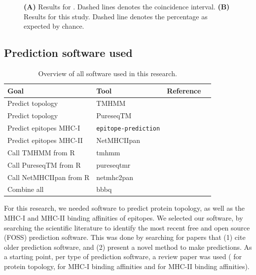 \begin{figure}
  \caption{
    \textbf{(A)} 
    Results for \cite{bianchi2017}. 
    Dashed lines denotes the coincidence interval.
    \textbf{(B)}
    Results for this study.
    Dashed line denotes the percentage as expected by chance.
  }
\end{figure}

\subsection{Prediction software used}
\label{subsec:prediction_software_used}

\begin{table}[]
  \begin{tabular}{llll}
    Goal & Tool & Reference \\ 
    \hline
    Predict topology                  & TMHMM                     & \cite{krogh2001predicting} \\
    Predict topology                  & PureseqTM                 & \cite{wang2019efficient} \\
    Predict epitopes MHC-I            & \verb;epitope-prediction; & \cite{bianchi2017} \\
    Predict epitopes MHC-II           & NetMHCIIpan               & \cite{nielsen2008quantitative,karosiene2013netmhciipan} \\
    Call TMHMM from R                 & tmhmm                     & \cite{tmhmm} \\
    Call PureseqTM from R             & pureseqtmr                & \cite{pureseqtmr} \\
    Call NetMHCIIpan from R           & netmhc2pan                & \cite{netmhc2pan} \\
    Combine all                       & bbbq                      & \cite{bbbq}
  \end{tabular}
  \caption{
    Overview of all software used in this research.
  }
  \label{table:software_used}
\end{table}


For this research, we needed software to predict protein
topology, as well as the MHC-I and MHC-II binding affinities
of epitopes. We selected our software, by
searching the scientific literature 
to identify the most recent free and open source (FOSS) 
prediction software.
This was done by searching for papers that (1) cite older
prediction software, and (2) present a novel method to make predictions.
As a starting point, per type of prediction software,
a review paper was used (\cite{moller2001evaluation} for protein
topology, \cite{lundegaard2011prediction} for MHC-I
binding affinities and \cite{nielsen2003reliable} for MHC-II binding
affinities). 

